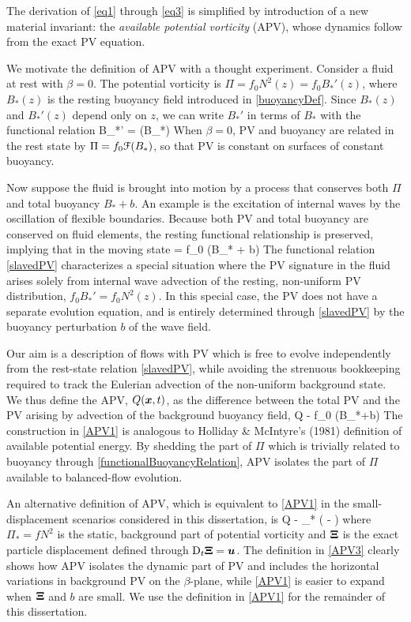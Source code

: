 \documentclass[12pt, oneside]{book}
\begin{document}
The derivation of \eqref{eq1} through \eqref{eq3}  is simplified by introduction of a new material invariant: the \textit{available potential vorticity} (APV), whose dynamics follow from the exact PV equation.

We motivate the definition of APV with a thought experiment.  Consider a fluid at rest with $\beta=0$.  The potential vorticity is $\Pi = f_0 N^2(z) = f_0 B_*'(z)$, where $B_*(z)$ is the resting buoyancy field introduced in \eqref{buoyancyDef}.  Since $B_*(z)$ and $B_*'(z)$ depend only on $z$, we can write $B_*'$ in terms of $B_*$ with the functional relation
\beq
B_*' = \cF(B_*) \per
\label{functionalBuoyancyRelation}
\eeq
When $\beta=0$, PV and buoyancy are  related in the rest state by  $\Pi = f_0 \mathcal{F}(B_*)$, so that PV is constant on surfaces of constant buoyancy. 

Now suppose the fluid is brought into motion by a process that conserves both $\Pi$ and total buoyancy $B_* + b$.  An example is the excitation of internal waves by the oscillation of flexible boundaries.  Because both PV and total buoyancy are conserved on fluid elements, the resting functional relationship is preserved, implying that in the moving state 
\beq
\Pi = f_0 \cF(B_* + b) \per
\label{slavedPV}
\eeq
The functional relation \eqref{slavedPV} characterizes a special situation where the PV signature in the fluid arises solely from internal wave advection of the resting, non-uniform PV distribution, $f_0 B_*'=f_0 N^2(z)$.  In this special case, the PV  does not have a separate evolution equation, and is entirely determined through \eqref{slavedPV} by the buoyancy perturbation $b$ of the wave field.   

Our aim is a description of flows with PV which is free to evolve independently from the rest-state relation \eqref{slavedPV}, while avoiding the strenuous bookkeeping required to track the Eulerian advection of the non-uniform background state.  We thus define the APV, $Q(\boldsymbol x,t)$, as the difference between the total PV and the PV arising by advection of the background buoyancy field,
\beq
Q  \Pi - f_0 \cF(B_*+b)  \per \label{APV1}
\eeq
The construction in \eqref{APV1}  is analogous to Holliday \& McIntyre's (1981) definition of available potential energy.  By shedding the part of $\Pi$ which is trivially related to buoyancy through \eqref{functionalBuoyancyRelation}, APV isolates the part of $\Pi$  available to balanced-flow evolution.

An alternative definition of APV, which is equivalent to \eqref{APV1} in the small-displacement scenarios considered in this dissertation, is
\beq
Q  \Pi - \Pi_* \left ( \bx - \bXi \right ) \com
\label{APV3}
\eeq
where $\Pi_* = f N^2$ is the static, background part of potential vorticity and $\boldsymbol {\Xi}$ is the exact particle displacement defined through $\mathrm{D}_t \boldsymbol {\Xi} = \boldsymbol u$.  The definition in \eqref{APV3} clearly shows how APV isolates the dynamic part of PV and includes the horizontal variations in background PV on the $\beta$-plane, while \eqref{APV1} is easier to expand when $\boldsymbol {\Xi}$ and $b$ are small.  We use the definition in \eqref{APV1} for the remainder of this dissertation.
\end{document}
